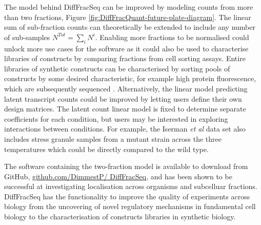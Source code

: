 \documentclass[../main.tex]{subfiles}
\begin{document}
The model behind DiffFracSeq can be improved by modeling counts from more than two fractions, Figure \ref{fig:DiffFracQuant-future-plate-diagram}.
The linear sum of sub-fraction counts can theoretically be extended to include any number of sub-samples $N^{Tot} = \displaystyle\sum_i N^{i}$.
Enabling more fractions to be normalised could unlock more use cases for the software as it could also be used to characterise libraries of constructs by comparing fractions from cell sorting assays.
Entire libraries of synthetic constructs can be characterised by sorting pools of constructs by some desired characteristic, for example high protein fluorescence, which are subsequently sequenced \parencite{Sharon2012}.
Alternatively, the linear model predicting latent transcript counts could be improved by letting users define their own design matrices.
The latent count linear model is fixed to determine separate coefficients for each condition, but users may be interested in exploring interactions between conditions.
For example, the Iserman \textit{et al} data set also includes stress granule samples from a mutant strain across the three temperatures which could be directly compared to the wild type. 

The software containing the two-fraction model is available to download from GitHub, \href{https://github.com/DimmestP/DiffFracSeq}{github.com/DimmestP/ DiffFracSeq}, and has been shown to be successful at investigating localisation across organisms and subcelluar fractions.
DiffFracSeq has the functionality to improve the quality of experiments across biology from the uncovering of novel regulatory mechanisms in fundamental cell biology to the characterisation of constructs libraries in synthetic biology.
\end{document}
